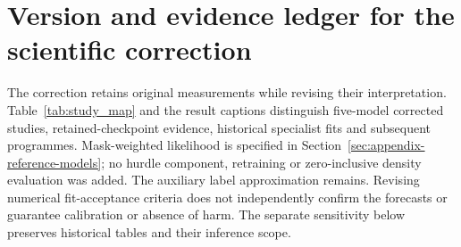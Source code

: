 \section{Version and evidence ledger for the scientific correction}
\label{sec:scientific-correction-ledger}

The correction retains original measurements while revising their interpretation. Table~\ref{tab:study_map} and the result captions distinguish five-model corrected studies, retained-checkpoint evidence, historical specialist fits and subsequent programmes. Mask-weighted likelihood is specified in Section~\ref{sec:appendix-reference-models}; no hurdle component, retraining or zero-inclusive density evaluation was added. The auxiliary label approximation remains. Revising numerical fit-acceptance criteria does not independently confirm the forecasts or guarantee calibration or absence of harm. The separate sensitivity below preserves historical tables and their inference scope.


